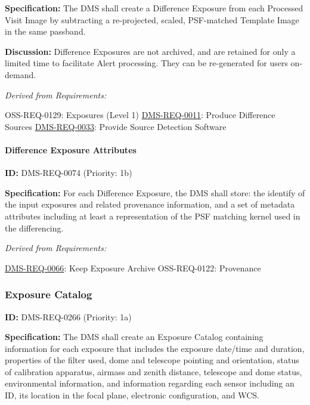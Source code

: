 \documentclass[SE,toc,lsstdraft]{lsstdoc}
\begin{document}
\textbf{Specification:} The DMS shall create a Difference Exposure from each Processed Visit Image by subtracting a re-projected, scaled, PSF-matched Template Image in the same passband.

\textbf{Discussion:} Difference Exposures are not archived, and are retained for only a limited time to facilitate Alert processing. They can be re-generated for users on-demand.

\emph{Derived from Requirements:}

OSS-REQ-0129:
Exposures (Level 1) \newline
\hyperref[DMS-REQ-0011]{DMS-REQ-0011}:
Produce Difference Sources \newline
\hyperref[DMS-REQ-0033]{DMS-REQ-0033}:
Provide Source Detection Software \newline

\paragraph{Difference Exposure Attributes}\hfill  %

\label{DMS-REQ-0074}
\textbf{ID:} DMS-REQ-0074 (Priority: 1b)

\textbf{Specification:} For each Difference Exposure, the DMS shall store: the identify of the input exposures and related provenance information, and a set of metadata attributes including at least a representation of the PSF matching kernel used in the differencing.

\emph{Derived from Requirements:}

\hyperref[DMS-REQ-0066]{DMS-REQ-0066}:
Keep Exposure Archive \newline
OSS-REQ-0122:
Provenance \newline

\subsubsection{Exposure Catalog}

\label{DMS-REQ-0266}
\textbf{ID:} DMS-REQ-0266 (Priority: 1a)

\textbf{Specification:} The DMS shall create an Exposure Catalog containing information for each exposure that includes the exposure date/time and duration, properties of the filter used, dome and telescope pointing and orientation, status of calibration apparatus, airmass and zenith distance, telescope and dome status, environmental information, and information regarding each sensor including an ID, its location in the focal plane, electronic configuration, and WCS.
\end{document}
